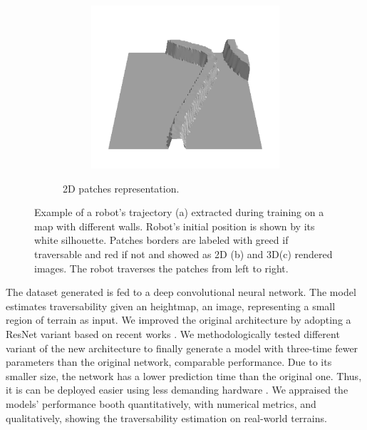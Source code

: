 \documentclass[../document.tex]{subfiles}
\begin{document}
\begin{figure} [htbp]
\begin{subfigure}[b]{1\textwidth}
\begin{subfigure}[b]{0.24\textwidth}
    \includegraphics[width=\linewidth]{../img/bars1-example-patches/3d/14.png}    
    \end{subfigure}  
\caption{2D patches representation.}
\label{fig : patch-extraction}
\end{subfigure}
\caption{Example of a robot's trajectory (a) extracted during training on a map with different walls. Robot's initial position is shown by its white silhouette. Patches borders are labeled with greed if traversable and red if not and showed as 2D (b) and 3D(c) rendered images. The robot traverses the patches from left to right.}
\end{figure}

The dataset generated is fed to a deep convolutional neural network. The model estimates traversability given an heightmap, an image, representing a small region of terrain as input. We improved the original architecture by adopting a ResNet variant based on recent works \cite{he2015deep} \cite{he2015identity} \cite{hu2017squeeze}. We methodologically tested different variant of the new architecture to finally generate a model with three-time fewer parameters than the original network, comparable performance. Due to its smaller size, the network has a lower prediction time than the original one. Thus, it is can be deployed easier using less demanding hardware . We appraised the models' performance booth quantitatively, with numerical metrics, and qualitatively, showing the traversability estimation on real-world terrains.
\end{document}
